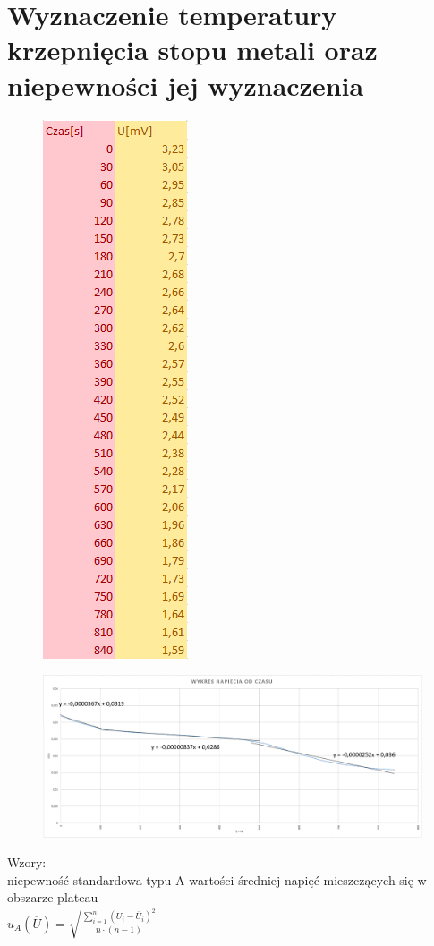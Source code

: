\documentclass{article}
\begin{document}
\section{Wyznaczenie temperatury krzepnięcia stopu metali oraz niepewności jej
wyznaczenia}
\begin{figure}[h]
    \begin{center}
    \includegraphics[scale=0.6]{wyniki2.PNG}
    \end{center}
\end{figure}
\begin{figure}[h]
    \begin{center}
    \includegraphics[width=16cm]{wykres2.PNG}
    \end{center}
\end{figure}
Wzory:\\
 niepewność standardowa typu A wartości
średniej napięć mieszczących się w obszarze plateau\\
$u_{A}(\overline{U})=\sqrt{\frac{\sum_{i=1}^{n}(U_{i}-\overline{U}_{i})^2}{n\cdot(n-1)}}$\\
\end{document}
